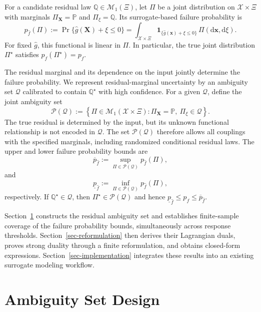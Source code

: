 \documentclass[review,11pt,3p,authoryear,nopreprintline]{elsarticle}
\begin{document}
For a candidate residual law $\mathbb Q\in\mathcal M_1(\Xi)$, let $\Pi$ be a joint distribution on $\mathcal X\times\Xi$ with marginals $\Pi_{\bm X}=\mathbb P$ and $\Pi_\xi=\mathbb Q$. Its surrogate-based failure probability is
\begin{equation}
  p_{\hat f}(\Pi):=\Pr\{\hat g(\bm X)+\xi\le0\}=\int_{\mathcal X\times\Xi}\mathbf 1_{\{\hat g(\bm x)+\xi\le0\}}\,\Pi(\mathrm d\bm x,\mathrm d\xi).
  \label{eq-surrogate-failure-probability}
\end{equation}
For fixed $\hat g$, this functional is linear in $\Pi$. In particular, the true joint distribution $\Pi^\star$ satisfies $p_{\hat f}(\Pi^\star)=p_f$.

The residual marginal and its dependence on the input jointly determine the failure probability. We represent residual-marginal uncertainty by an ambiguity set $\mathcal Q$ calibrated to contain $\mathbb Q^\star$ with high confidence. For a given $\mathcal Q$, define the joint ambiguity set
\[
  \mathcal P(\mathcal Q) :=\left\{\Pi\in\mathcal M_1(\mathcal X\times\Xi):\Pi_{\bm X}=\mathbb P,\ \Pi_\xi\in\mathcal Q\right\}.
\]
The true residual is determined by the input, but its unknown functional relationship is not encoded in $\mathcal Q$. The set $\mathcal P(\mathcal Q)$ therefore allows all couplings with the specified marginals, including randomized conditional residual laws. The upper and lower failure probability bounds are
\begin{equation}
  \overline p_{\hat f}:=\sup_{\Pi\in\mathcal P(\mathcal Q)}p_{\hat f}(\Pi),
  \label{eq-upper-bound}
\end{equation}
and
\begin{equation}
  \underline p_{\hat f}:=\inf_{\Pi\in\mathcal P(\mathcal Q)}p_{\hat f}(\Pi),
  \label{eq-lower-bound}
\end{equation}
respectively. If $\mathbb Q^\star\in\mathcal Q$, then $\Pi^\star\in\mathcal P(\mathcal Q)$ and hence $\underline p_{\hat f}\le p_f\le\overline p_{\hat f}$.


Section~\ref{sec-ambiguity-set} constructs the residual ambiguity set and establishes finite-sample coverage of the failure probability bounds, simultaneously across response thresholds. Section~\ref{sec-reformulation} then derives their Lagrangian duals, proves strong duality through a finite reformulation, and obtains closed-form expressions. Section~\ref{sec-implementation} integrates these results into an existing surrogate modeling workflow.


\section{Ambiguity Set Design}
\label{sec-ambiguity-set}
\end{document}
